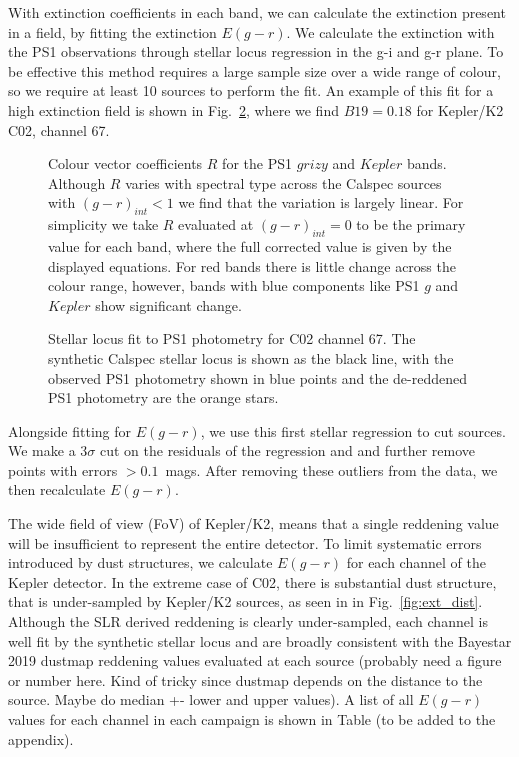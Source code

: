 \documentclass{aastex63}
\begin{document}
With extinction coefficients in each band, we can calculate the extinction present in a field, by fitting the extinction $E(g-r)$. We calculate the extinction with the PS1 observations through stellar locus regression in the g-i and g-r plane. To be effective this method requires a large sample size over a wide range of colour, so we require at least 10 sources to perform the fit. An example of this fit for a high extinction field is shown in Fig.~\ref{fig:av_fit}, where we find $B19 = 0.18$ for Kepler/K2 C02, channel 67.

\begin{figure}
\caption{Colour vector coefficients $R$ for the PS1 $grizy$ and $Kepler$ bands. Although $R$ varies with spectral type across the Calspec sources with $(g-r)_{int} < 1$ we find that the variation is largely linear. For simplicity we take $R$ evaluated at ${(g-r)_{int} =0}$ to be the primary value for each band, where the full corrected value is given by the displayed equations. For red bands there is little change across the colour range, however, bands with blue components like PS1 $g$ and $Kepler$ show significant change. \label{fig:R_fits}}
\end{figure}

\begin{figure}
\caption{Stellar locus fit to PS1 photometry for C02 channel 67. The synthetic Calspec stellar locus is shown as the black line, with the observed PS1 photometry shown in blue points and the de-reddened PS1 photometry are the orange stars. \label{fig:av_fit}}
\end{figure}

Alongside fitting for $E(g-r)$, we use this first stellar regression to cut sources. We make a $3\sigma$ cut  on the residuals of the regression and and further remove points with errors $>0.1$~mags. After removing these outliers from the data, we then recalculate $E(g-r)$.


The wide field of view (FoV) of Kepler/K2, means that a single reddening value will be insufficient to represent the entire detector. To limit systematic errors introduced by dust structures, we calculate $E(g-r)$ for each channel of the Kepler detector. In the extreme case of C02, there is substantial dust structure, that is under-sampled by Kepler/K2 sources, as seen in in Fig.~\ref{fig:ext_dist}. Although the SLR derived reddening is clearly under-sampled, each channel is well fit by the synthetic stellar locus and are broadly consistent with the Bayestar 2019 dustmap reddening values evaluated at each source (probably need a figure or number here. Kind of tricky since dustmap depends on the distance to the source. Maybe do median +- lower and upper values). A list of all $E(g-r)$ values for each channel in each campaign is shown in Table (to be added to the appendix).
\end{document}
